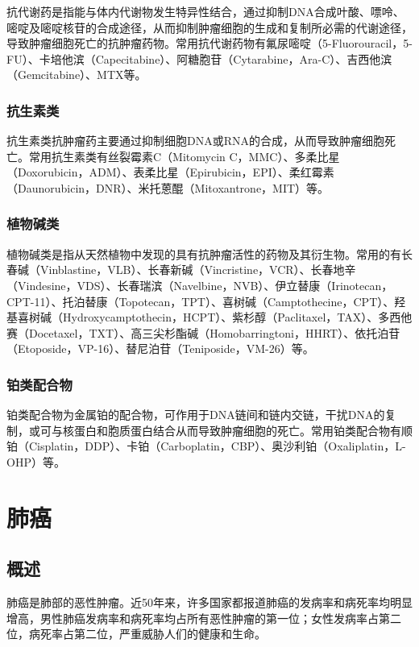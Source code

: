 抗代谢药是指能与体内代谢物发生特异性结合，通过抑制DNA合成叶酸、嘌呤、嘧啶及嘧啶核苷的合成途径，从而抑制肿瘤细胞的生成和复制所必需的代谢途径，导致肿瘤细胞死亡的抗肿瘤药物。常用抗代谢药物有氟尿嘧啶（5-Fluorouracil，5-FU）、卡培他滨（Capecitabine）、阿糖胞苷（Cytarabine，Ara-C）、吉西他滨（Gemcitabine）、MTX等。

\subsubsection{抗生素类}

抗生素类抗肿瘤药主要通过抑制细胞DNA或RNA的合成，从而导致肿瘤细胞死亡。常用抗生素类有丝裂霉素C（Mitomycin
C，MMC）、多柔比星（Doxorubicin，ADM）、表柔比星（Epirubicin，EPI）、柔红霉素（Daunorubicin，DNR）、米托蒽醌（Mitoxantrone，MIT）等。

\subsubsection{植物碱类}

植物碱类是指从天然植物中发现的具有抗肿瘤活性的药物及其衍生物。常用的有长春碱（Vinblastine，VLB）、长春新碱（Vincristine，VCR）、长春地辛（Vindesine，VDS）、长春瑞滨（Navelbine，NVB）、伊立替康（Irinotecan，CPT-11）、托泊替康（Topotecan，TPT）、喜树碱（Camptothecine，CPT）、羟基喜树碱（Hydroxycamptothecin，HCPT）、紫杉醇（Paclitaxel，TAX）、多西他赛（Docetaxel，TXT）、高三尖杉酯碱（Homobarringtoni，HHRT）、依托泊苷（Etoposide，VP-16）、替尼泊苷（Teniposide，VM-26）等。

\subsubsection{铂类配合物}

铂类配合物为金属铂的配合物，可作用于DNA链间和链内交链，干扰DNA的复制，或可与核蛋白和胞质蛋白结合从而导致肿瘤细胞的死亡。常用铂类配合物有顺铂（Cisplatin，DDP）、卡铂（Carboplatin，CBP）、奥沙利铂（Oxaliplatin，L-OHP）等。

\section{肺癌}

\subsection{概述}

肺癌是肺部的恶性肿瘤。近50年来，许多国家都报道肺癌的发病率和病死率均明显增高，男性肺癌发病率和病死率均占所有恶性肿瘤的第一位；女性发病率占第二位，病死率占第二位，严重威胁人们的健康和生命。

